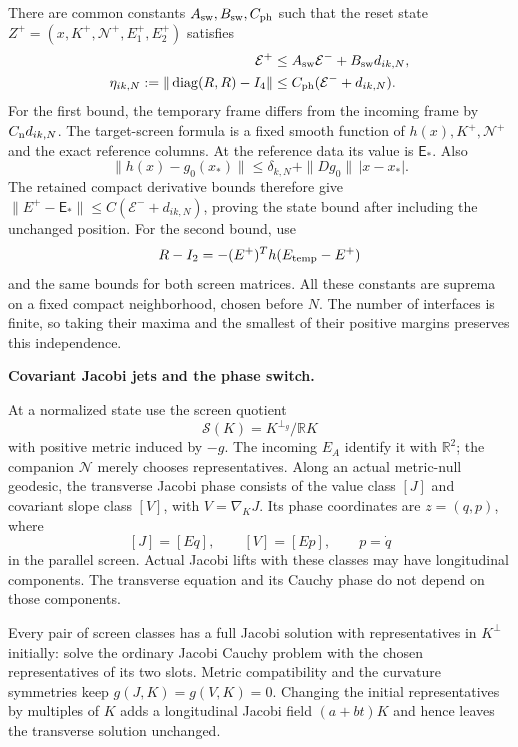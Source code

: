 \documentclass[
  english,
  11pt,
  reqno]{amsart}
\begin{document}
There are common constants \(A_{\rm sw},B_{\rm sw},C_{\rm ph}\) such
that the reset state \(Z^+=(x,K^+,\mathcal N^+,E_1^+,E_2^+)\) satisfies
\[
 \begin{aligned}
 \mathcal E^+
   &\le A_{\rm sw}\mathcal E^-+B_{\rm sw}d_{ik,N},\\
 \eta_{ik,N}:=\|\operatorname{diag}(R,R)-I_4\|
   &\le C_{\rm ph}(\mathcal E^-+d_{ik,N}).
 \end{aligned}
\] For the first bound, the temporary frame differs from the incoming
frame by \(C_{\rm n}d_{ik,N}\). The target-screen formula is a fixed
smooth function of \(h(x),K^+,\mathcal N^+\) and the exact reference
columns. At the reference data its value is \(\mathsf E_*\). Also \[
 \|h(x)-g_0(x_*)\|
 \le\delta_{k,N}+\|Dg_0\|\,|x-x_*|.
\] The retained compact derivative bounds therefore give
\(\|E^+-\mathsf E_*\|\le C(\mathcal E^-+d_{ik,N})\), proving the state
bound after including the unchanged position. For the second bound, use
\[
 R-I_2=-(E^+)^Th(E_{\rm temp}-E^+)
\] and the same bounds for both screen matrices. All these constants are
suprema on a fixed compact neighborhood, chosen before \(N\). The number
of interfaces is finite, so taking their maxima and the smallest of
their positive margins preserves this independence.

\textbf{Covariant Jacobi jets and the phase switch.}

At a normalized state use the screen quotient \[
 \mathscr S(K)=K^{\perp_g}/\mathbb RK
\] with positive metric induced by \(-g\). The incoming \(E_A\) identify
it with \(\mathbb R^2\); the companion \(\mathcal N\) merely chooses
representatives. Along an actual metric-null geodesic, the transverse
Jacobi phase consists of the value class \([J]\) and covariant slope
class \([V]\), with \(V=\nabla_KJ\). Its phase coordinates are
\(z=(q,p)\), where \[
 [J]=[Eq],\qquad [V]=[Ep],\qquad p=\dot q
\] in the parallel screen. Actual Jacobi lifts with these classes may
have longitudinal components. The transverse equation and its Cauchy
phase do not depend on those components.

Every pair of screen classes has a full Jacobi solution with
representatives in \(K^\perp\) initially: solve the ordinary Jacobi
Cauchy problem with the chosen representatives of its two slots. Metric
compatibility and the curvature symmetries keep \(g(J,K)=g(V,K)=0\).
Changing the initial representatives by multiples of \(K\) adds a
longitudinal Jacobi field \((a+bt)K\) and hence leaves the transverse
solution unchanged.
\end{document}
